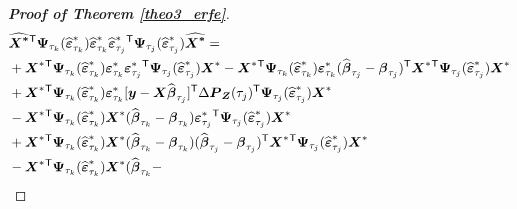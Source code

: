 \documentclass[15pt,a4paper]{article}
\newcommand{\transpose}{{}^{\text{\sffamily T}}}
\begin{document}
\begin{proof}[\textbf{Proof of Theorem \ref{theo3_erfe}}]
\begin{equation*}
\begin{split}
&{} \boldsymbol{\widehat{\boldsymbol{X}^{*}}}\transpose\boldsymbol{\Psi}_{\tau_k}(\widehat{\boldsymbol{\varepsilon}}^{*}_{\tau_k})\widehat{\boldsymbol{\varepsilon}}^{*}_{\tau_k}\widehat{\boldsymbol{\varepsilon}}^{*}_{\tau_j}\transpose
        \boldsymbol{\Psi}_{\tau_j}(\widehat{\boldsymbol{\varepsilon}}^{*}_{\tau_j})\boldsymbol{\widehat{\boldsymbol{X}^{*}}}= \\
& + \boldsymbol{X}^{*}\transpose\boldsymbol{\Psi}_{\tau_k}(\widehat{\boldsymbol{\varepsilon}}^{*}_{\tau_k})\boldsymbol{\varepsilon}^{*}_{\tau_{k}}\boldsymbol{\varepsilon}^{*}_{\tau_{j}}\transpose\boldsymbol{\Psi}_{\tau_j}(\widehat{\boldsymbol{\varepsilon}}^{*}_{\tau_j})
        \boldsymbol{X}^{*} - \boldsymbol{X}^{*}\transpose\boldsymbol{\Psi}_{\tau_k}(\widehat{\boldsymbol{\varepsilon}}^{*}_{\tau_k})\boldsymbol{\varepsilon}^{*}_{\tau_{k}}(\widehat{\boldsymbol{\beta}}_{\tau_{j}} - \boldsymbol{\beta}_{\tau_{j}})\transpose  \boldsymbol{X}^{*}\transpose\boldsymbol{\Psi}_{\tau_j}(\widehat{\boldsymbol{\varepsilon}}^{*}_{\tau_j})\boldsymbol{X}^{*}\\
& + \boldsymbol{X}^{*}\transpose\boldsymbol{\Psi}_{\tau_k}(\widehat{\boldsymbol{\varepsilon}}^{*}_{\tau_k})\boldsymbol{\varepsilon}^{*}_{\tau_{k}}[\boldsymbol{y}-\boldsymbol{X}\widehat{\boldsymbol{\beta}}_{\tau_{j}}]\transpose
        \Delta\boldsymbol{P}_{\boldsymbol{Z}}(\tau_{j})\transpose\boldsymbol{\Psi}_{\tau_j}(\widehat{\boldsymbol{\varepsilon}}^{*}_{\tau_j})\boldsymbol{X}^{*}\\
& - \boldsymbol{X}^{*}\transpose\boldsymbol{\Psi}_{\tau_k}(\widehat{\boldsymbol{\varepsilon}}^{*}_{\tau_k})\boldsymbol{X}^{*} (\widehat{\boldsymbol{\beta}}_{\tau_{k}} - \boldsymbol{\beta}_{\tau_{k}})\boldsymbol{\varepsilon}^{*}_{\tau_{j}}\transpose
    \boldsymbol{\Psi}_{\tau_j}(\widehat{\boldsymbol{\varepsilon}}^{*}_{\tau_j})\boldsymbol{X}^{*}\\
& + \boldsymbol{X}^{*}\transpose\boldsymbol{\Psi}_{\tau_k}(\widehat{\boldsymbol{\varepsilon}}^{*}_{\tau_k})\boldsymbol{X}^{*} (\widehat{\boldsymbol{\beta}}_{\tau_{k}} - \boldsymbol{\beta}_{\tau_{k}})(\widehat{\boldsymbol{\beta}}_{\tau_{j}} -         \boldsymbol{\beta}_{\tau_{j}})\transpose\boldsymbol{X}^{*}\transpose\boldsymbol{\Psi}_{\tau_j}(\widehat{\boldsymbol{\varepsilon}}^{*}_{\tau_j})\boldsymbol{X}^{*}\\
& - \boldsymbol{X}^{*}\transpose\boldsymbol{\Psi}_{\tau_k}(\widehat{\boldsymbol{\varepsilon}}^{*}_{\tau_k})\boldsymbol{X}^{*} (\widehat{\boldsymbol{\beta}}_{\tau_{k}} -     

\end{split}
\end{equation*}
\end{proof}
\end{document}
